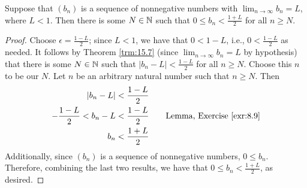 \documentclass[../main.tex]{subfiles}
\begin{document}
\begin{lemma}\label{lem:16.14}
    Suppose that $(b_n)$ is a sequence of nonnegative numbers with $\lim_{n\to\infty}b_n=L$, where $L<1$. Then there is some $N\in\mathbb{N}$ such that $0\leq b_n<\frac{1+L}{2}$ for all $n\geq N$.
    \begin{proof}
        Choose $\epsilon=\frac{1-L}{2}$; since $L<1$, we have that $0<1-L$, i.e., $0<\frac{1-L}{2}$ as needed. It follows by Theorem \ref{trm:15.7} (since $\lim_{n\to\infty}b_n=L$ by hypothesis) that there is some $N\in\mathbb{N}$ such that $|b_n-L|<\frac{1-L}{2}$ for all $n\geq N$. Choose this $n$ to be our $N$. Let $n$ be an arbitrary natural number such that $n\geq N$. Then 
        \begin{align*}
            |b_n-L| &< \frac{1-L}{2}\\
            -\frac{1-L}{2} < b_n-L &< \frac{1-L}{2}\tag*{Lemma, Exercise \ref{exr:8.9}}\\
            b_n &< \frac{1+L}{2}
        \end{align*}
        Additionally, since $(b_n)$ is a sequence of nonnegative numbers, $0\leq b_n$. Therefore, combining the last two results, we have that $0\leq b_n<\frac{1+L}{2}$, as desired.
    \end{proof}
\end{lemma}
\end{document}
